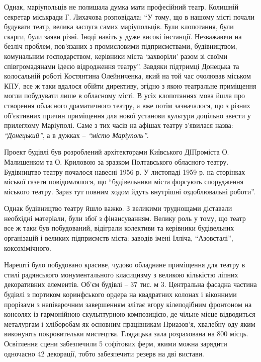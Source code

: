 Однак, маріупольців не полишала думка мати професійний театр. Колишній секретар
міськради Г. Лихачова розповідала: \enquote{У тому, що в нашому місті почали будувати
театр, велика заслуга самих маріупольців. Були клопотання, були скарги, були
заяви різні. Іноді навіть у дуже високі інстанції. Незважаючи на безліч
проблем, пов'язаних з промисловими підприємствами, будівництвом, комунальним
господарством, керівники міста \enquote{захворіли} разом зі своїми співгромадянами
ідеєю відродження театру}. Завдяки підтримці Донецька та колосальній роботі
Костянтина Олейниченка, який на той час очолював міськом КПУ, все ж таки
вдалося обійти директиву, згідно з якою театральне приміщення могли побудувати
лише в обласному місті. В усіх клопотаннях мова йшла про створення обласного
драматичного театру, а вже потім зазначалося, що з різних об'єктивних причин
приміщення для нової установи культури доцільно звести у прилеглому Маріуполі.
Саме з тих часів на афішах театру   з'явилася назва: \emph{\enquote{Донецький}}, а в дужках –
\emph{\enquote{місто Маріуполь}}.


 Проект будівлі був розроблений архітекторами  Київського  ДІПроміста О.
Малишенком та О. Криловою за зразком Полтавського обласного театру. Будівництво
театру почалося навесні 1956 р. У листопаді 1959 р. на сторінках міської газети
повідомлялося, що \enquote{будівельники міста форсують спорудження міського театру.
Зараз тут повним ходом йдуть внутрішні оздоблювальні роботи}.

Однак будівництво театру йшло важко. З великими труднощами діставали необхідні
матеріали, були збої з фінансуванням. Велику роль у тому, що театр все ж таки
був побудований, відіграли колективи та керівники будівельних організацій і
великих підприємств міста: заводів імені Ілліча, \enquote{Азовсталі}, коксохімічного. 


Нарешті було побудовано красиве, чудово обладнане приміщення для театру в стилі
радянського монументального класицизму з великою кількістю ліпних декоративних
елементів. Об'єм будівлі – 37 тис. м 3. Центральна фасадна частина будівлі з
портиком коринфського ордера на квадратних колонах і віконними прорізами з
напіварочним завершенням злітає вгору кілеподібним фронтоном на консолях із
гармонійною скульптурною композицією, де чільне місце відводиться металургам і
хліборобам як основним працівникам Приазов'я, хвалебну оду яким виконують
покровительки мистецтва. Глядацька зала розрахована на 800 місць. Освітлення
сцени забезпечили 5 софітових ферм, якими можна зарядити одночасно 42
декорації, тобто забезпечити резерв на дві вистави.

